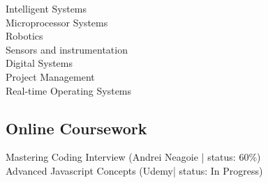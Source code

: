 \documentclass[letterpaper]{deedy-resume}
\begin{document}
\begin{center}
\begin{minipage}[t]{0.29\textwidth}
Intelligent Systems \\ \vspace{1mm}
Microprocessor Systems \\ \vspace{1mm}
Robotics \\ \vspace{1mm}
Sensors and instrumentation\\ \vspace{1mm}
Digital Systems\\ \vspace{1mm}
Project Management\\ \vspace{1mm}
Real-time Operating Systems \\ \vspace{1mm}




\sectionspace
\subsection {Online Coursework}
\sectionspace
Mastering Coding Interview (Andrei Neagoie | status: 60\%) 
\\ \vspace{2 mm}
Advanced Javascript Concepts (Udemy| status: In Progress) 


\end{minipage}
\end{center}
\end{document}
